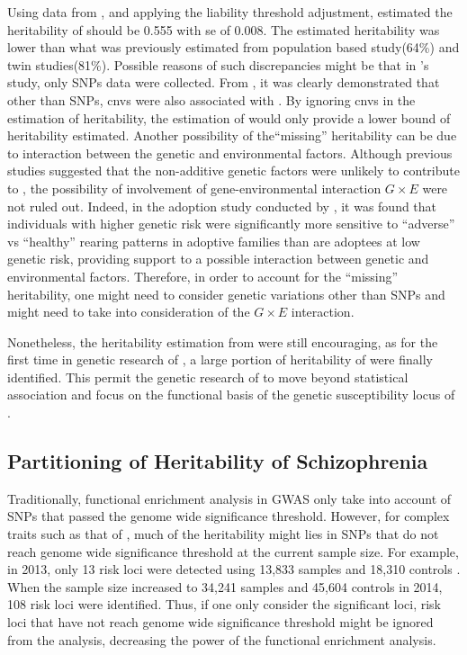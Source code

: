	
	Using data from \citet{Ripke2014}, and applying the liability threshold adjustment, \citet{Bulik-Sullivan2015} estimated the heritability of  should be 0.555 with \gls{se} of 0.008.
	The estimated heritability was lower than what was previously estimated from population based study(64\%\citep{Lichtenstein2009}) and twin studies(81\%\citep{Sullivan2003}).
	Possible reasons of such discrepancies might be that in \citet{Ripke2014}'s study, only \glspl{SNP} data were collected. 
	From \citet{Szatkiewicz2014}, it was clearly demonstrated that other than \glspl{SNP}, \glspl{cnv} were also associated with .
	By ignoring \glspl{cnv} in the estimation of heritability, the estimation of \citet{Bulik-Sullivan2015} would only provide a lower bound of heritability estimated.
	Another possibility of the``missing'' heritability can be due to interaction between the genetic and environmental factors. 
	Although previous studies\citep{Gottesman01071967} suggested that the non-additive genetic factors were unlikely to contribute to , the possibility of involvement of gene-environmental interaction $G\times E$ were not ruled out.
	Indeed, in the adoption study conducted by \citet{Tienari2004}, it was found that individuals with higher genetic risk were significantly more sensitive to ``adverse'' vs ``healthy'' rearing patterns in adoptive families than are adoptees at low genetic risk\citep{Tienari2004}, providing support to a possible interaction between genetic and environmental factors.
	Therefore, in order to account for the ``missing'' heritability, one might need to consider genetic variations other than \glspl{SNP} and might need to take into consideration of the $G\times E$ interaction.
	
	Nonetheless, the heritability estimation from \citet{Ripke2014} were still encouraging, as for the first time in genetic research of , a large portion of heritability of  were finally identified.
	This permit the genetic research of  to move beyond statistical association and focus on the functional basis of the genetic susceptibility locus of .
	
	\subsection{Partitioning of Heritability of Schizophrenia}
	Traditionally, functional enrichment analysis in \gls{GWAS} only take into account of \glspl{SNP} that passed the genome wide significance threshold. 
	However, for complex traits such as that of , much of the heritability might lies in \glspl{SNP} that do not reach genome wide significance threshold at the current sample size.
	For example, in 2013, only 13 risk loci were detected using 13,833  samples and 18,310 controls \citep{Ripke2013}. 
	When the sample size increased to 34,241  samples and 45,604 controls in 2014, 108 risk loci were identified\citep{Ripke2014}. 
	Thus, if one only consider the significant loci, risk loci that have not reach genome wide significance threshold might be ignored from the analysis, decreasing the power of the functional enrichment analysis.
	
